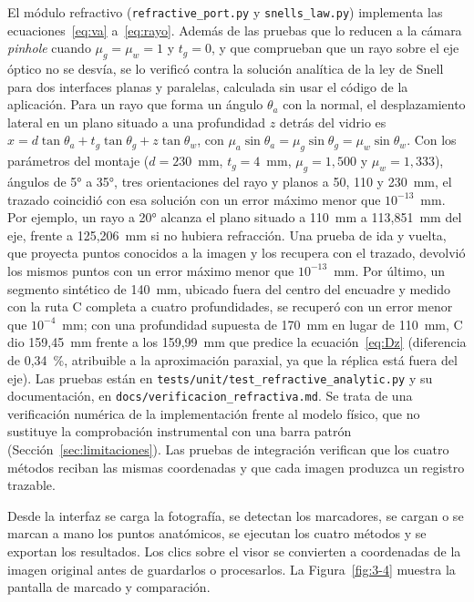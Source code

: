El módulo refractivo (\texttt{refractive\_port.py} y \texttt{snells\_law.py}) implementa las ecuaciones~\eqref{eq:va} a~\eqref{eq:rayo}. Además de las pruebas que lo reducen a la cámara \emph{pinhole} cuando $\mu_g = \mu_w = 1$ y $t_g = 0$, y que comprueban que un rayo sobre el eje óptico no se desvía, se lo verificó contra la solución analítica de la ley de Snell para dos interfaces planas y paralelas, calculada sin usar el código de la aplicación. Para un rayo que forma un ángulo $\theta_a$ con la normal, el desplazamiento lateral en un plano situado a una profundidad $z$ detrás del vidrio es $x = d\tan\theta_a + t_g\tan\theta_g + z\tan\theta_w$, con $\mu_a\sin\theta_a = \mu_g\sin\theta_g = \mu_w\sin\theta_w$. Con los parámetros del montaje ($d = 230$~mm, $t_g = 4$~mm, $\mu_g = 1{,}500$ y $\mu_w = 1{,}333$), ángulos de 5° a 35°, tres orientaciones del rayo y planos a 50, 110 y 230~mm, el trazado coincidió con esa solución con un error máximo menor que $10^{-13}$~mm. Por ejemplo, un rayo a 20° alcanza el plano situado a 110~mm a 113,851~mm del eje, frente a 125,206~mm si no hubiera refracción. Una prueba de ida y vuelta, que proyecta puntos conocidos a la imagen y los recupera con el trazado, devolvió los mismos puntos con un error máximo menor que $10^{-13}$~mm. Por último, un segmento sintético de 140~mm, ubicado fuera del centro del encuadre y medido con la ruta C completa a cuatro profundidades, se recuperó con un error menor que $10^{-4}$~mm; con una profundidad supuesta de 170~mm en lugar de 110~mm, C dio 159,45~mm frente a los 159,99~mm que predice la ecuación~\eqref{eq:Dz} (diferencia de 0,34~\%, atribuible a la aproximación paraxial, ya que la réplica está fuera del eje). Las pruebas están en \texttt{tests/unit/test\_refractive\_analytic.py} y su documentación, en \texttt{docs/verificacion\_refractiva.md}. Se trata de una verificación numérica de la implementación frente al modelo físico, que no sustituye la comprobación instrumental con una barra patrón (Sección~\ref{sec:limitaciones}). Las pruebas de integración verifican que los cuatro métodos reciban las mismas coordenadas y que cada imagen produzca un registro trazable.

Desde la interfaz se carga la fotografía, se detectan los marcadores, se cargan o se marcan a mano los puntos anatómicos, se ejecutan los cuatro métodos y se exportan los resultados. Los clics sobre el visor se convierten a coordenadas de la imagen original antes de guardarlos o procesarlos. La Figura~\ref{fig:3-4} muestra la pantalla de marcado y comparación.

